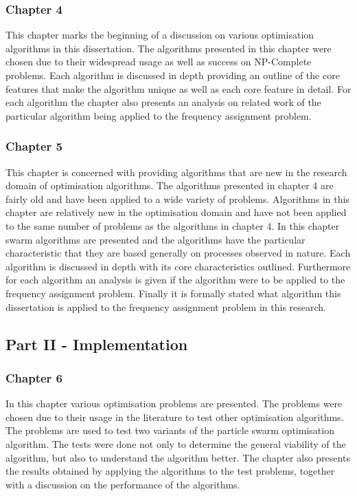 \subsubsection{Chapter 4}
This chapter marks the beginning of a discussion on various optimisation algorithms in this dissertation. The algorithms presented in this chapter were chosen due to their widespread usage as well as success on NP-Complete problems. Each algorithm is discussed in depth providing an outline of the core features that make the algorithm unique as well as each core feature in detail. For each algorithm the chapter also presents an analysis on related work of the particular algorithm being applied to the frequency assignment problem. 
\subsubsection{Chapter 5}
This chapter is concerned with providing algorithms that are new in the research domain of optimisation algorithms. The algorithms presented in chapter 4 are fairly old and have been applied to a wide variety of problems. Algorithms in this chapter are relatively new in the optimisation domain and have not been applied to the same number of problems as the algorithms in chapter 4. In this chapter swarm algorithms are presented and the algorithms have the particular characteristic that they are based generally on processes observed in nature. Each algorithm is discussed in depth with its core characteristics outlined. Furthermore for each algorithm an analysis is given if the algorithm were to be applied to the frequency assignment problem. Finally it is formally stated what algorithm this dissertation is applied to the frequency assignment problem in this research.
\subsection{Part II - Implementation}
\subsubsection{Chapter 6}
In this chapter various optimisation problems are presented. The problems were chosen due to their usage in the literature to test other optimisation algorithms. The problems are used to test two variants of the particle swarm optimisation algorithm. The tests were done not only to determine the general viability of the algorithm, but also to understand the algorithm better. The chapter also presents the results obtained by applying the algorithms to the test problems, together with a discussion on the performance of the algorithms.
